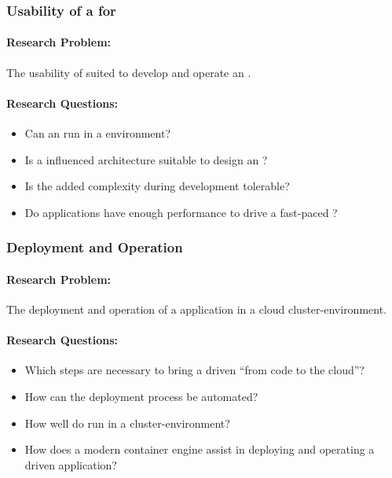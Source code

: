 \subsubsection{Usability of a \ms{} for \ogs{}} 

\paragraph{Research Problem:} The usability of \ms{} suited to develop and
operate an \og{}.

\paragraph{Research Questions:}
\begin{itemize}
  \item Can an \og{} run in a \ms{} environment?
  \item Is a \ms{} influenced architecture suitable to design an \og{}?
  \item Is the added complexity during development tolerable?
  \item Do \ms{} applications have enough performance to drive a fast-paced
  \ogs{}?
\end{itemize}

\subsubsection{Deployment and Operation}

\paragraph{Research Problem:} The deployment and operation of a \ms{}
application in a cloud cluster-environment.

\paragraph{Research Questions:}
\begin{itemize}
  \item Which steps are necessary to bring a \ms{} driven \og{} ``from code to
  the cloud''?
  \item How can the deployment process be automated?
  \item How well do \ogs{} run in a cluster-environment?
  \item How does a modern container engine assist in deploying and operating a
  \ms{} driven application?
\end{itemize}

